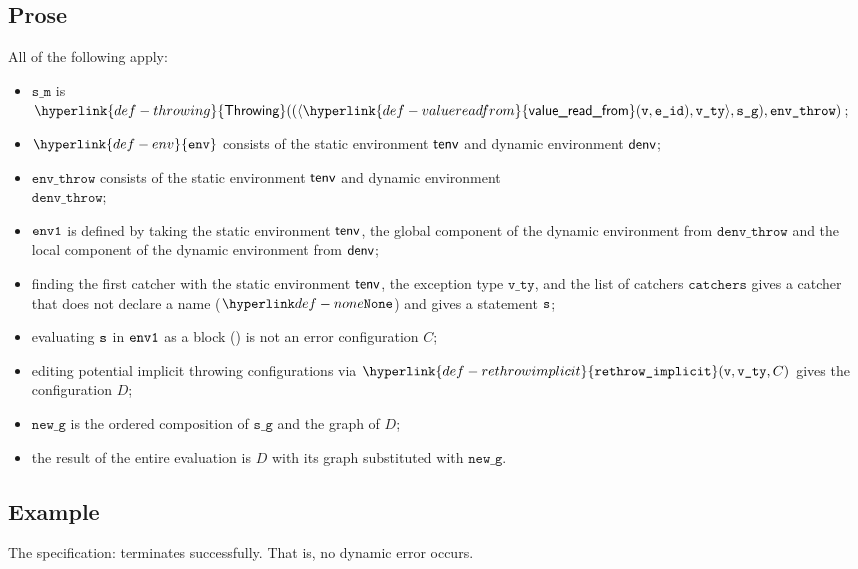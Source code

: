\documentclass{book}
\newcommand\ErrorConfig[0]{\hyperlink{def-errorconfig}{\texttt{\#DE}}}
\newcommand\ProseOrError[0]{\ProseTerminateAs{\ErrorConfig}}
\newcommand\rethrowimplicit[0]{\hyperlink{def-rethrowimplicit}{\texttt{rethrow\_implicit}}}
\newcommand\valuereadfrom[0]{\hyperlink{def-valuereadfrom}{\textsf{value\_read\_from}}}
\newcommand\Throwing[0]{\hyperlink{def-throwing}{\textsf{Throwing}}}
\newcommand\env[0]{\hyperlink{def-env}{\texttt{env}}}
\newcommand\newg[0]{\texttt{new\_g}}
\newcommand\catchers[0]{\texttt{catchers}}
\newcommand\envthrow[0]{\texttt{env\_throw}}
\newcommand\denvthrow[0]{\texttt{denv\_throw}}
\newcommand\sm[0]{\texttt{s\_m}}
\newcommand\sg[0]{\texttt{s\_g}}
\newcommand\vvty[0]{\texttt{v\_ty}}
\newcommand\eid[0]{\texttt{e\_id}}
\begin{document}
\subsection{Prose}
All of the following apply:
\begin{itemize}
  \item $\sm$ is $\Throwing((\langle \valuereadfrom(\vv, \eid), \vvty \rangle, \sg), \envthrow)$;
  \item $\env$ consists of the static environment $\textsf{tenv}$ and dynamic environment $\textsf{denv}$;
  \item $\envthrow$ consists of the static environment $\textsf{tenv}$ and dynamic environment \\ $\denvthrow$;
  \item $\texttt{env1}$ is defined by taking the static environment $\textsf{tenv}$, the global component of the dynamic
        environment from $\denvthrow$ and the local component of the dynamic environment from $\textsf{denv}$;
  \item finding the first catcher with the static environment $\textsf{tenv}$, the exception type $\vvty$,
  and the list of catchers $\catchers$ gives a catcher that does not declare a name ($\None$) and gives a statement $\texttt{s}$;
  \item evaluating $\texttt{s}$ in $\texttt{env1}$ as a block () is not an error
        configuration $C$\ProseOrError;
  \item editing potential implicit throwing configurations via $\rethrowimplicit(\vv, \vvty, C)$
        gives the configuration $D$;
  \item $\newg$ is the ordered composition of $\sg$ and the graph of $D$;
  \item the result of the entire evaluation is $D$ with its graph substituted with $\newg$.
\end{itemize}

\subsection{Example}
The specification:
terminates successfully. That is, no dynamic error occurs.

\end{document}
